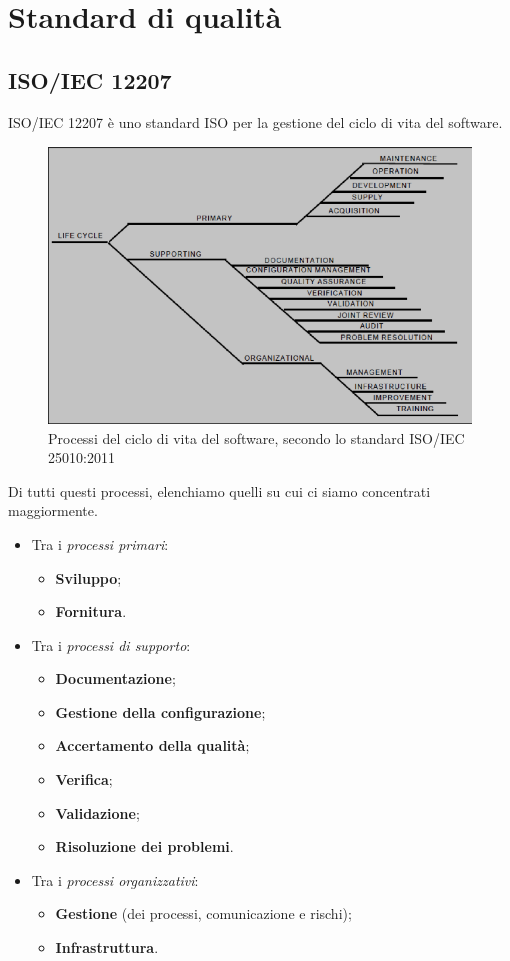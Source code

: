 \section{Standard di qualità}
\subsection{ISO/IEC 12207}
ISO/IEC 12207 è uno standard ISO per la gestione del ciclo di vita del software.\\
\begin{figure}[h!]
	\centering
	\includegraphics[scale=0.4]{res/images/ISO_12207.png}
	\caption{Processi del ciclo di vita del software, secondo lo standard ISO/IEC 25010:2011}
\end{figure}
Di tutti questi processi, elenchiamo quelli su cui ci siamo concentrati maggiormente.
\begin{itemize}
	\item Tra i \textit{processi primari}:
		\begin{itemize}
			\item \textbf{Sviluppo};
			\item \textbf{Fornitura}.
		\end{itemize}
	\item Tra i \textit{processi di supporto}:
		\begin{itemize}
			\item \textbf{Documentazione};
			\item \textbf{Gestione della configurazione};
			\item \textbf{Accertamento della qualità};
			\item \textbf{Verifica};
			\item \textbf{Validazione};
			\item \textbf{Risoluzione dei problemi}.
		\end{itemize}
	\item Tra i \textit{processi organizzativi}:
	\begin{itemize}
		\item \textbf{Gestione} (dei processi, comunicazione e rischi);
		\item \textbf{Infrastruttura}.
	\end{itemize}
\end{itemize}
